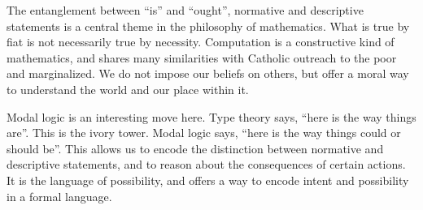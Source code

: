 \documentclass[sigplan,nonacm]{acmart}\settopmatter{printfolios=false,printccs=false,printacmref=false}
\begin{document}
  The entanglement between ``is'' and ``ought'', normative and descriptive statements is a central theme in the philosophy of mathematics. What is true by fiat is not necessarily true by necessity. Computation is a constructive kind of mathematics, and shares many similarities with Catholic outreach to the poor and marginalized. We do not impose our beliefs on others, but offer a moral way to understand the world and our place within it.

  Modal logic is an interesting move here. Type theory says, ``here is the way things are''. This is the ivory tower. Modal logic says, ``here is the way things could or should be''. This allows us to encode the distinction between normative and descriptive statements, and to reason about the consequences of certain actions. It is the language of possibility, and offers a way to encode intent and possibility in a formal language.

  
\end{document}
